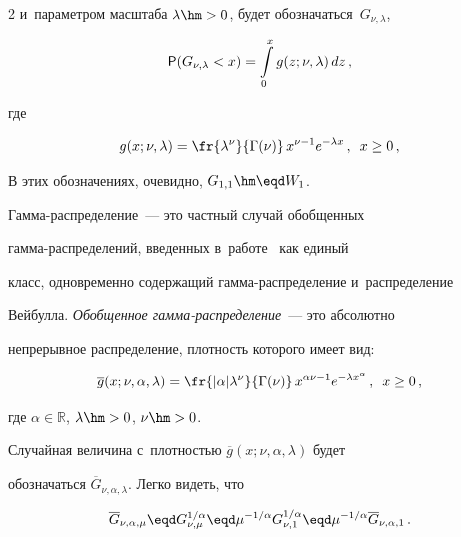 \begin{multicols}{2}
и~параметром масштаба $\lambda\hm>0$, будет обозначаться~$G_{\nu,\lambda}$,


\begin{equation*}


{\sf P}(G_{\nu,\lambda}<x)=\int\limits_{0}^{x}g(z;\nu,\lambda)\,dz\,,


\end{equation*}


где


$$


g(x;\nu,\lambda)=\fr{\lambda^\nu}{\Gamma(\nu)}\,x^{\nu-1}e^{-\lambda


x}\,,\enskip x\ge0\,,


$$


В этих обозначениях, очевидно, $G_{1,1}\hm\eqd W_1$.





Гамма-распределение~--- это частный случай обобщенных


гамма-распределений, введенных в~работе~\cite{Stacy1962} как единый


класс, одновременно содержащий гам\-ма-рас\-пре\-де\-ле\-ние и~распределение


Вейбулла. \textit{Обобщенное гам\-ма-рас\-пре\-де\-ле\-ние}~--- это абсолютно


непрерывное распределение, плотность которого имеет вид:


$$


\overline{g}(x;\nu,\alpha,\lambda)=\fr{|\alpha|\lambda^\nu}{\Gamma(\nu)}\,x^{\alpha


\nu-1}e^{-\lambda x^{\alpha}}\,,\enskip x\ge0\,,


$$


где $\alpha\in\mathbb{R}$, $\lambda\hm>0$, $\nu\hm>0$.





Случайная величина с~плот\-ностью $\overline{g}(x;\nu,\alpha,\lambda)$ будет


обозначаться $\overline{G}_{\nu,\alpha,\lambda}$. Легко видеть, что


$$


\overline{G}_{\nu,\alpha,\mu}\eqd G_{\nu,\mu}^{1/\alpha}\eqd


\mu^{-1/\alpha}G_{\nu,1}^{1/\alpha}


\eqd\mu^{-1/\alpha}\overline{G}_{\nu,\alpha,1}\,.


$$






\end{multicols}

